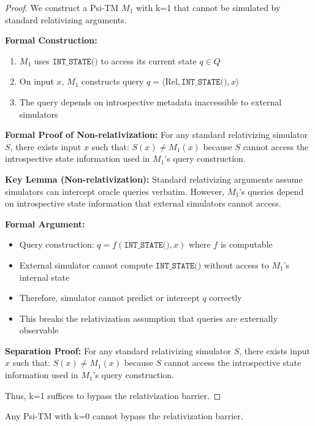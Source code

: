 \documentclass[11pt]{article}
\begin{document}
\begin{proof}
We construct a Psi-TM $M_1$ with k=1 that cannot be simulated by standard relativizing arguments.

\textbf{Formal Construction:}
\begin{enumerate}
\item $M_1$ uses $\texttt{INT\_STATE()}$ to access its current state $q \in Q$
\item On input $x$, $M_1$ constructs query $q = \langle \text{Rel}, \texttt{INT\_STATE()}, x \rangle$
\item The query depends on introspective metadata inaccessible to external simulators
\end{enumerate}

\textbf{Formal Proof of Non-relativization:}
For any standard relativizing simulator $S$, there exists input $x$ such that:
$S(x) \neq M_1(x)$ because $S$ cannot access the introspective state information used in $M_1$'s query construction.

\textbf{Key Lemma (Non-relativization):} Standard relativizing arguments assume simulators can intercept oracle queries verbatim. However, $M_1$'s queries depend on introspective state information that external simulators cannot access.

\textbf{Formal Argument:}
\begin{itemize}
\item Query construction: $q = f(\texttt{INT\_STATE()}, x)$ where $f$ is computable
\item External simulator cannot compute $\texttt{INT\_STATE()}$ without access to $M_1$'s internal state
\item Therefore, simulator cannot predict or intercept $q$ correctly
\item This breaks the relativization assumption that queries are externally observable
\end{itemize}

\textbf{Separation Proof:}
For any standard relativizing simulator $S$, there exists input $x$ such that:
$S(x) \neq M_1(x)$ because $S$ cannot access the introspective state information used in $M_1$'s query construction.

Thus, k=1 suffices to bypass the relativization barrier.
\end{proof}

\begin{theorem}
\label{thm:relativization-k0}
Any Psi-TM with k=0 cannot bypass the relativization barrier.
\end{theorem}
\end{document}
